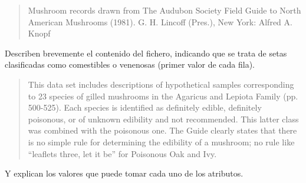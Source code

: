 \begin{quote}
   Mushroom records drawn from The Audubon Society Field Guide to North American Mushrooms (1981). G. H. Lincoff (Pres.), New York: Alfred A. Knopf 
\end{quote}
\noindent Describen brevemente el contenido del fichero, indicando que se trata de setas clasificadas como comestibles o venenosas (primer valor de cada fila).
\begin{quote}
   This data set includes descriptions of hypothetical samples corresponding to 23 species of gilled mushrooms in the Agaricus and Lepiota Family (pp. 500-525). Each species is identified as definitely edible, definitely poisonous, or of unknown edibility and not recommended. This latter class was combined with the poisonous one. The Guide clearly states that there is no simple rule for determining the edibility of a mushroom; no rule like ``leaflets three, let it be'' for Poisonous Oak and Ivy.
\end{quote}
\noindent Y explican los valores que puede tomar cada uno de los atributos.
